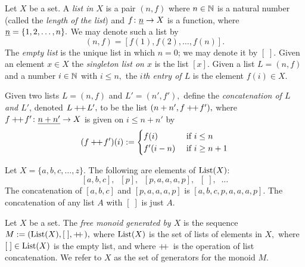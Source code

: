 \documentclass[CT4S-EN-RU]{subfiles}
\begin{document}

\subsubsection{}\label{sec:free monoid}

\begin{definitionENG}\label{def:list}
Let $X$ be a set. A {\em list in $X$} is a pair $(n,f)$ where $n\in{\mathbb N}$ is a natural number (called the {\em length of the list}) and $f\colon\underline{n}\rightarrow X$ is a function, where $\underline{n}=\{1,2,\ldots,n\}.$ We may denote such a list by
$$(n,f)=[f(1),f(2),\ldots,f(n)].$$
The {\em empty list} is the unique list in which $n=0$; we may denote it by $[\;].$ Given an element $x\in X$ the {\em singleton list on $x$} is the list $[x].$ Given a list $L=(n,f)$ and a number $i\in{\mathbb N}$ with $i\leq n,$ the {\em $i$th entry of $L$} is the element $f(i)\in X.$ 

Given two lists $L=(n,f)$ and $L'=(n',f'),$ define the {\em concatenation of $L$ and $L'$}, denoted $L+\!\!+\hspace{1pt} L',$ to be the list $(n+n',f+\!\!+\hspace{1pt} f'),$ where $f+\!\!+\hspace{1pt} f'\colon \underline{n+n'}\rightarrow X$ is given on $i\leq n+n'$ by
$$(f+\!\!+\hspace{1pt} f')(i):=
\begin{cases}
f(i)&\textnormal{ if }i\leq n\\
f'(i-n)&\textnormal{ if }i\geq n+1
\end{cases}
$$
\end{definitionENG}

\begin{definitionRUS}\label{def:list}
\end{definitionRUS}

\begin{exampleENG}
Let $X=\{a,b,c,\ldots,z\}.$ The following are elements of $\textnormal{List}(X)$: $$[a,b,c],\;\; [p],\;\; [p,a,a,a,p],\;\; [\;],\;\;\dots$$ The concatenation of $[a,b,c]$ and $[p,a,a,a,p]$ is $[a,b,c,p,a,a,a,p].$ The concatenation of any list $A$ with $[\;]$ is just $A.$
\end{exampleENG}

\begin{exampleRUS}
\end{exampleRUS}

\begin{definitionENG}\label{def:free monoid}
Let $X$ be a set. The {\em free monoid generated by $X$} is the sequence $M:=(\textnormal{List}(X),[\;],+\!\!+\hspace{1pt}),$ where $\textnormal{List}(X)$ is the set of lists of elements in $X,$ where $[\;]\in\textnormal{List}(X)$ is the empty list, and where $+\!\!+\hspace{1pt}$ is the operation of list concatenation. We refer to $X$ as the set of generators for the monoid $M.$
\end{definitionENG}
\end{document}
